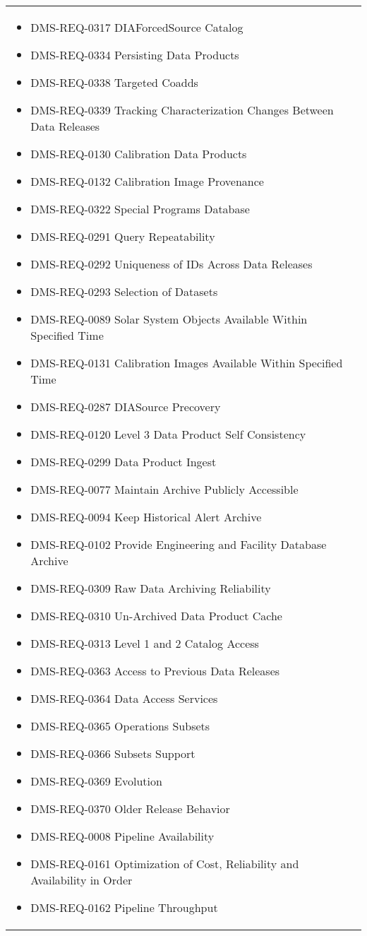 \begin{xtabular}{lp{0.7\textwidth}}
\begin{itemize}
\item DMS-REQ-0317 DIAForcedSource Catalog
\item DMS-REQ-0334 Persisting Data Products
\item DMS-REQ-0338 Targeted Coadds
\item DMS-REQ-0339 Tracking Characterization Changes Between Data Releases
\item DMS-REQ-0130 Calibration Data Products
\item DMS-REQ-0132 Calibration Image Provenance
\item DMS-REQ-0322 Special Programs Database
\item DMS-REQ-0291 Query Repeatability
\item DMS-REQ-0292 Uniqueness of IDs Across Data Releases
\item DMS-REQ-0293 Selection of Datasets
\item DMS-REQ-0089 Solar System Objects Available Within Specified Time
\item DMS-REQ-0131 Calibration Images Available Within Specified Time
\item DMS-REQ-0287 DIASource Precovery
\item DMS-REQ-0120 Level 3 Data Product Self Consistency
\item DMS-REQ-0299 Data Product Ingest
\item DMS-REQ-0077 Maintain Archive Publicly Accessible
\item DMS-REQ-0094 Keep Historical Alert Archive
\item DMS-REQ-0102 Provide Engineering and Facility Database Archive
\item DMS-REQ-0309 Raw Data Archiving Reliability
\item DMS-REQ-0310 Un-Archived Data Product Cache
\item DMS-REQ-0313 Level 1 and 2 Catalog Access
\item DMS-REQ-0363 Access to Previous Data Releases
\item DMS-REQ-0364 Data Access Services
\item DMS-REQ-0365 Operations Subsets
\item DMS-REQ-0366 Subsets Support
\item DMS-REQ-0369 Evolution
\item DMS-REQ-0370 Older Release Behavior
\item DMS-REQ-0008 Pipeline Availability
\item DMS-REQ-0161 Optimization of Cost, Reliability and Availability in Order
\item DMS-REQ-0162 Pipeline Throughput

\end{itemize}
\end{xtabular}
